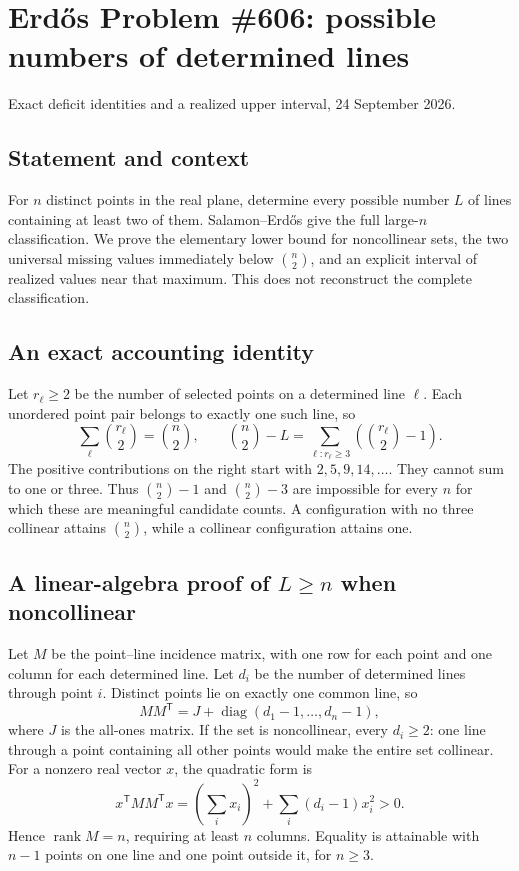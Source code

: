 \section{Erd\H{o}s Problem \#606: possible numbers of determined lines}
\noindent Exact deficit identities and a realized upper interval, 24 September 2026.

\subsection*{Statement and context}
For $n$ distinct points in the real plane, determine every possible number $L$ of lines containing at least two of them. Salamon--Erd\H{o}s give the full large-$n$ classification. We prove the elementary lower bound for noncollinear sets, the two universal missing values immediately below $\binom n2$, and an explicit interval of realized values near that maximum. This does not reconstruct the complete classification.

\subsection*{An exact accounting identity}
Let $r_\ell\geq2$ be the number of selected points on a determined line $\ell$. Each unordered point pair belongs to exactly one such line, so
\[\sum_\ell\binom{r_\ell}{2}=\binom n2,\qquad
\binom n2-L=\sum_{\ell:r_\ell\geq3}\left(\binom{r_\ell}{2}-1\right).\tag{1}
\]
The positive contributions on the right start with $2,5,9,14,\ldots$. They cannot sum to one or three. Thus $\binom n2-1$ and $\binom n2-3$ are impossible for every $n$ for which these are meaningful candidate counts. A configuration with no three collinear attains $\binom n2$, while a collinear configuration attains one.

\subsection*{A linear-algebra proof of $L\geq n$ when noncollinear}
Let $M$ be the point--line incidence matrix, with one row for each point and one column for each determined line. Let $d_i$ be the number of determined lines through point $i$. Distinct points lie on exactly one common line, so
\[MM^{\mathsf T}=J+\operatorname{diag}(d_1-1,\ldots,d_n-1),
\]
where $J$ is the all-ones matrix. If the set is noncollinear, every $d_i\geq2$: one line through a point containing all other points would make the entire set collinear. For a nonzero real vector $x$, the quadratic form is
\[x^{\mathsf T}MM^{\mathsf T}x
=\left(\sum_i x_i\right)^2+\sum_i(d_i-1)x_i^2>0.
\]
Hence $\operatorname{rank}M=n$, requiring at least $n$ columns. Equality is attainable with $n-1$ points on one line and one point outside it, for $n\geq3$.

